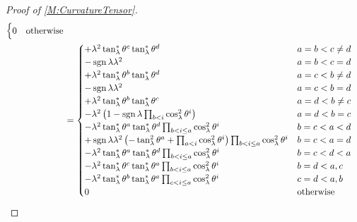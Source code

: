 \documentclass[../methodology.tex]{subfiles}
\begin{document}
\begin{proof}[Proof of \cref{M:CurvatureTensor}]
\begin{align*}
\begin{cases}
          0 & \text{otherwise}      \\
        \end{cases}                                           \\
     & =\begin{cases}
          +\lambda^2\tan_\lambda^\ast\tensor{\theta}{^c}\tan_\lambda^\ast\tensor{\theta}{^d}
            & \text{\(a=b<c\ne d\)} \\
          -\sign{\lambda}\lambda^2
            & \text{\(a=b<c=d\)}    \\
          +\lambda^2\tan_\lambda^\ast\tensor{\theta}{^b}\tan_\lambda^\ast\tensor{\theta}{^d}
            & \text{\(a=c<b\ne d\)} \\
          -\sign{\lambda}\lambda^2
            & \text{\(a=c<b=d\)}    \\
          +\lambda^2\tan_\lambda^\ast\tensor{\theta}{^b}\tan_\lambda^\ast\tensor{\theta}{^c}
            & \text{\(a=d<b\ne c\)} \\
          -\lambda^2
          \left(
          1-\sign{\lambda}\prod_{b<i}\cos_\lambda^2\tensor{\theta}{^i}
          \right)
            & \text{\(a=d<b=c\)}    \\
          -\lambda^2\tan_\lambda^\ast\tensor{\theta}{^a}\tan_\lambda^\ast\tensor{\theta}{^d}\prod_{b<i\le a}\cos_\lambda^2\tensor{\theta}{^i}
            & \text{\(b=c<a<d\)}    \\
          +\sign{\lambda}\lambda^2
          \left(
          -\tan_\lambda^2\tensor{\theta}{^a}
          +\prod_{a<i}\cos_\lambda^2\tensor{\theta}{^i}
          \right)
          \prod_{b<i\le a}{\cos_\lambda^2\tensor{\theta}{^i}}
            & \text{\(b=c<a=d\)}    \\
          -\lambda^2\tan_\lambda^\ast\tensor{\theta}{^a}\tan_\lambda^\ast\tensor{\theta}{^d}\prod_{b<i\le a}{\cos_\lambda^2\tensor{\theta}{^i}}
            & \text{\(b=c<d<a\)}    \\
          -\lambda^2\tan_\lambda^\ast\tensor{\theta}{^c}\tan_\lambda^\ast\tensor{\theta}{^a}\prod_{b<i\le a}\cos_\lambda^2\tensor{\theta}{^i}
            & \text{\(b=d<a,c\)}    \\
          -\lambda^2\tan_\lambda^\ast\tensor{\theta}{^b}\tan_\lambda^\ast\tensor{\theta}{^a}\prod_{c<i\le a}\cos_\lambda^2\tensor{\theta}{^i}
            & \text{\(c=d<a,b\)}    \\
          0 & \text{otherwise}      \\
        \end{cases}                                            \\

\end{align*}
\end{proof}
\end{document}
